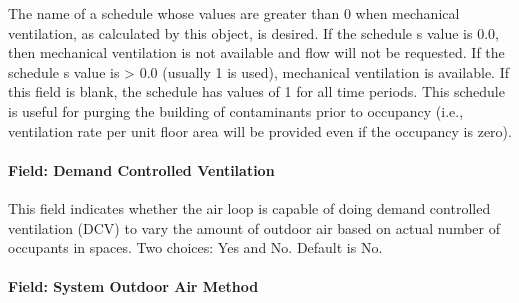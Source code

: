 The name of a schedule whose values are greater than 0 when mechanical ventilation, as calculated by this object, is desired. If the schedule s value is 0.0, then mechanical ventilation is not available and flow will not be requested. If the schedule s value is \textgreater{} 0.0 (usually 1 is used), mechanical ventilation is available. If this field is blank, the schedule has values of 1 for all time periods. This schedule is useful for purging the building of contaminants prior to occupancy (i.e., ventilation rate per unit floor area will be provided even if the occupancy is zero).

\paragraph{Field: Demand Controlled Ventilation}\label{field-demand-controlled-ventilation}

This field indicates whether the air loop is capable of doing demand controlled ventilation (DCV) to vary the amount of outdoor air based on actual number of occupants in spaces. Two choices: Yes and No. Default is No.

\paragraph{Field: System Outdoor Air Method}\label{field-system-outdoor-air-method}


